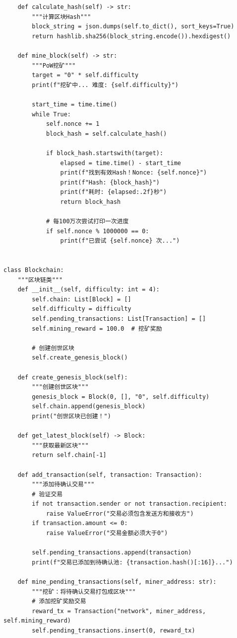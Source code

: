 ﻿\documentclass[12pt,a4paper]{article}
\begin{document}
\begin{lstlisting}
    def calculate_hash(self) -> str:
        """计算区块Hash"""
        block_string = json.dumps(self.to_dict(), sort_keys=True)
        return hashlib.sha256(block_string.encode()).hexdigest()
    
    def mine_block(self) -> str:
        """PoW挖矿"""
        target = "0" * self.difficulty
        print(f"挖矿中... 难度: {self.difficulty}")
        
        start_time = time.time()
        while True:
            self.nonce += 1
            block_hash = self.calculate_hash()
            
            if block_hash.startswith(target):
                elapsed = time.time() - start_time
                print(f"找到有效Hash！Nonce: {self.nonce}")
                print(f"Hash: {block_hash}")
                print(f"耗时: {elapsed:.2f}秒")
                return block_hash
            
            # 每100万次尝试打印一次进度
            if self.nonce % 1000000 == 0:
                print(f"已尝试 {self.nonce} 次...")


class Blockchain:
    """区块链类"""
    def __init__(self, difficulty: int = 4):
        self.chain: List[Block] = []
        self.difficulty = difficulty
        self.pending_transactions: List[Transaction] = []
        self.mining_reward = 100.0  # 挖矿奖励
        
        # 创建创世区块
        self.create_genesis_block()
    
    def create_genesis_block(self):
        """创建创世区块"""
        genesis_block = Block(0, [], "0", self.difficulty)
        self.chain.append(genesis_block)
        print("创世区块已创建！")
    
    def get_latest_block(self) -> Block:
        """获取最新区块"""
        return self.chain[-1]
    
    def add_transaction(self, transaction: Transaction):
        """添加待确认交易"""
        # 验证交易
        if not transaction.sender or not transaction.recipient:
            raise ValueError("交易必须包含发送方和接收方")
        if transaction.amount <= 0:
            raise ValueError("交易金额必须大于0")
        
        self.pending_transactions.append(transaction)
        print(f"交易已添加到待确认池: {transaction.hash()[:16]}...")
    
    def mine_pending_transactions(self, miner_address: str):
        """挖矿：将待确认交易打包成区块"""
        # 添加挖矿奖励交易
        reward_tx = Transaction("network", miner_address, self.mining_reward)
        self.pending_transactions.insert(0, reward_tx)
        

\end{lstlisting}
\end{document}
